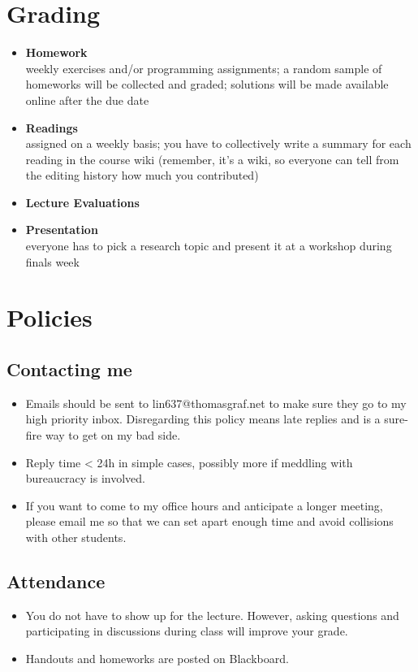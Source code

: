 \section{Grading}
\begin{itemize}
    \item \textbf{Homework}\\
        weekly exercises and/or programming assignments; a random sample of homeworks will be collected and graded; solutions will be made available online after the due date
    \item \textbf{Readings}\\
        assigned on a weekly basis; you have to collectively write a summary for each reading in the course wiki (remember, it's a wiki, so everyone can tell from the editing history how much you contributed) 
    \item \textbf{Lecture Evaluations}\\
    \item \textbf{Presentation}\\
        everyone has to pick a research topic and present it at a workshop during finals week
\end{itemize}


\section{Policies}

\subsection{Contacting me}
\begin{itemize}
    \item Emails should be sent to lin637@thomasgraf.net to make sure they go to my high priority inbox.
        Disregarding this policy means late replies and is a sure-fire way to get on my bad side.
    \item Reply time < 24h in simple cases, possibly more if meddling with bureaucracy is involved.
    \item If you want to come to my office hours and anticipate a longer meeting, please email me so that we can set apart enough time and avoid collisions with other students.
\end{itemize}

\subsection{Attendance}
\begin{itemize}
    \item You do not have to show up for the lecture. However, asking questions and participating in discussions during class will improve your grade.
    \item Handouts and homeworks are posted on Blackboard.
\end{itemize}

